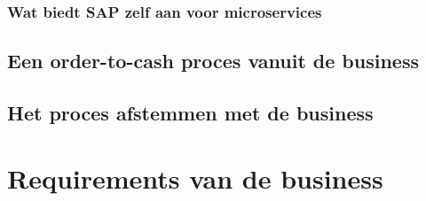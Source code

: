 \subsubsection{Wat biedt SAP zelf aan voor microservices}
\subsection{Een order-to-cash proces vanuit de business}
\subsection{Het proces afstemmen met de business}

\section{Requirements van de business}

